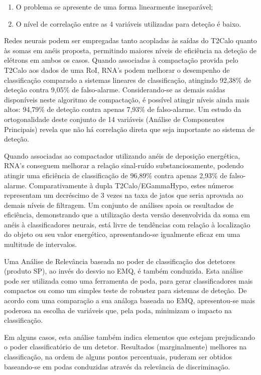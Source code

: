 \begin{enumerate}
\item O problema se apresente de uma forma linearmente inseparável;
\item O nível de correlação entre as 4 variáveis utilizadas para deteção é
baixo.
\end{enumerate}

Redes neurais podem ser empregadas tanto acopladas às saídas do T2Calo quanto
às somas em anéis proposta, permitindo maiores níveis de eficiência na deteção
de elétrons em ambos os casos. Quando associadas à compactação provida pelo
T2Calo aos dados de uma RoI, RNA's podem melhorar o desempenho de
classificação comparado a sistemas lineares de classificação, atingindo
92,38\% de deteção contra 9,05\% de falso-alarme. Considerando-se as demais
saídas disponíveis neste algoritmo de compactação, é possível atingir níveis
ainda mais altos: 94,79\% de deteção contra apenas 7,93\% de falso-alarme. Um
estudo da ortogonalidade deste conjunto de 14 variáveis (Análise de
Componentes Principais) revela que não há correlação direta que seja
importante ao sistema de deteção.

Quando associadas ao compactador utilizando anéis de deposição energética,
RNA's conseguem melhorar a relação sinal-ruído substanciosamente, podendo
atingir uma eficiência de classificação de 96,89\% contra apenas 2,93\% de
falso-alarme. Comparativamente à dupla T2Calo/EGammaHypo, estes números
representam um decréscimo de 3 vezes na taxa de jatos que seria aprovada ao
demais níveis de filtragem. Um conjunto de análises apoia os resultados de
eficiência, demonstrando que a utilização desta versão desenvolvida da soma em
anéis à classificadores neurais, está livre de tendências com relação à
localização do objeto ou seu valor energético, apresentando-se igualmente
eficaz em uma multitude de intervalos.

Uma Análise de Relevância baseada no poder de classificação dos detetores
(produto SP), ao invés do desvio no EMQ, é também conduzida. Esta análise pode
ser utilizada como uma ferramenta de poda, para gerar classificadores mais
compactos ou como um simples teste de robustez para sistemas de deteção. De
acordo com uma comparação a sua análoga baseada no EMQ, apresentou-se mais
poderosa na escolha de variáveis que, pela poda, minimizam o impacto na
classificação.

Em alguns casos, esta análise também indica elementos que estejam prejudicando
o poder classificatório de um detetor. Resultados (marginalmente) melhores na
classificação, na ordem de alguns pontos percentuais, puderam ser obtidos
baseando-se em podas conduzidas através da relevância de discriminação.

